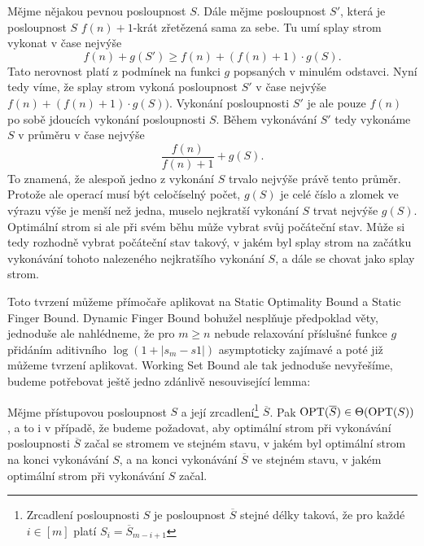 \begin{dukaz}
Mějme nějakou pevnou posloupnost $S$. Dále mějme posloupnost $S'$, která je
posloupnost $S$ $f(n)+1$-krát zřetězená sama za sebe. Tu umí splay strom
vykonat v čase nejvýše $$f(n) + g(S') \geq f(n) + (f(n)+1) \cdot g(S).$$ Tato
nerovnost platí z podmínek na funkci $g$ popsaných v minulém odstavci. Nyní
tedy víme, že splay strom vykoná posloupnost $S'$ v čase nejvýše
$f(n)+(f(n)+1)\cdot g(S))$. Vykonání posloupnosti $S'$ je ale pouze $f(n)$ po
sobě jdoucích vykonání posloupnosti $S$. Během vykonávání $S'$ tedy vykonáme
$S$ v průměru v čase nejvýše $$\frac{f(n)}{f(n)+1}+g(S).$$ To znamená, že
alespoň jedno z vykonání $S$ trvalo nejvýše právě tento průměr. Protože ale
operací musí být celočíselný počet, $g(S)$ je celé číslo a zlomek ve výrazu
výše je menší než jedna, muselo nejkratší vykonání $S$ trvat nejvýše $g(S)$.
Optimální strom si ale při svém běhu může vybrat svůj počáteční stav. Může si
tedy rozhodně vybrat počáteční stav takový, v jakém byl splay strom na začátku
vykonávání tohoto nalezeného nejkratšího vykonání $S$, a dále se chovat jako
splay strom.
\end{dukaz}

Toto tvrzení můžeme přímočaře aplikovat na Static Optimality Bound a Static Finger Bound. Dynamic Finger Bound bohužel nesplňuje předpoklad věty, jednoduše ale nahlédneme, že pro $m\geq n$ nebude relaxování příslušné funkce $g$ přidáním aditivního $\log(1+|s_{m} - s{1}|)$ asymptoticky zajímavé a poté již můžeme tvrzení aplikovat. Working Set Bound ale tak jednoduše nevyřešíme, budeme potřebovat ještě jedno zdánlivě nesouvisející lemma:

\begin{lemma}
Mějme přístupovou posloupnost $S$ a její zrcadlení\footnote{Zrcadlení posloupnosti $S$ je posloupnost $\overline S$ stejné délky taková, že pro každé $i\in [m]$ platí $S_i = \overline S_{m-i+1}$} $\overline S$. Pak $\operatorname{OPT}(\overline S) \in \Theta(\operatorname{OPT}(S))$, a to i v případě, že budeme požadovat, aby optimální strom při vykonávání posloupnosti $\overline{S}$ začal se stromem ve stejném stavu, v jakém byl optimální strom na konci vykonávání $S$, a na konci vykonávání $\overline S$ ve stejném stavu, v jakém optimální strom při vykonávání $S$ začal.
\end{lemma}

